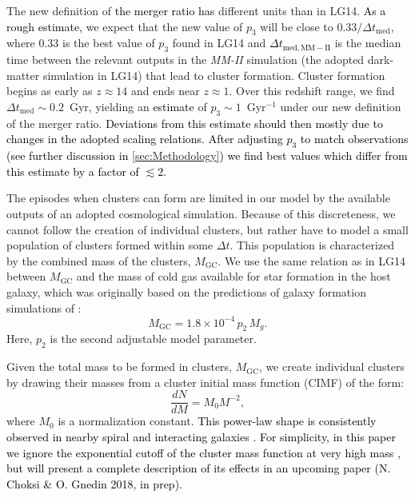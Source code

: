 \documentclass[fleqn,usenatbib]{mnras}
\newcommand{\rev}[1]{\textcolor{black}{#1}}
\newcommand{\Mgc}{M_{\mathrm{GC}}}
\begin{document}
The new definition of \rev{the merger ratio has} different units than in LG14. \rev{As a rough estimate,} we expect that the new value of $p_3$ will be close to $0.33/\Delta t_{\mathrm{med}}$, where 0.33 is the best value of $p_3$ found in LG14 and \rev{$\Delta t_\mathrm{med, MM-II}$} is the median time between the relevant outputs in the \textit{MM-II} simulation (the adopted dark-matter simulation in LG14) that lead to cluster formation. Cluster formation begins as early as $z \approx 14$ and ends near $z \approx 1$. Over this redshift range, we find $\Delta t_{\mathrm{med}} \sim 0.2$~Gyr, yielding an \rev{estimate} of $p_3 \sim 1$~Gyr$^{-1}$ under our new definition of the merger ratio. \rev{Deviations from this estimate should then mostly due to changes in the adopted scaling relations. After adjusting $p_3$ to match observations (see further discussion in \autoref{sec:Methodology}) we find best values which differ from this estimate by a factor of $\lesssim 2$.}

The episodes when clusters can form are limited in our model by the available outputs of an adopted cosmological simulation. Because of this discreteness, we cannot follow the creation of individual clusters, but rather have to model a small population of clusters formed within some $\Delta t$. This population is characterized by the combined mass of the clusters, $\Mgc$.  We use the same relation as in LG14 between $\Mgc$ and the mass of cold gas available for star formation in the host galaxy, which was originally based on the predictions of galaxy formation simulations of \citet{kravtsov_gnedin05}:
\begin{equation}
  \Mgc = 1.8\times 10^{-4}\, p_2 \, M_g.
  \label{eqn:mgc}
\end{equation}
Here, $p_2$ is the second adjustable model parameter. 

Given the total mass to be formed in clusters, $\Mgc$, we create individual clusters by drawing their masses from a cluster initial mass function (CIMF) of the form:
\begin{equation}
  \frac{dN}{dM} = M_0M^{-2},
  \label{eq:cimf}
\end{equation}
where $M_0$ is a normalization constant. \rev{This power-law shape is consistently observed in nearby spiral and interacting galaxies \citep[e.g.][]{portegies_zwart_etal10}. For simplicity, in this paper we ignore the exponential cutoff of the cluster mass function at very high mass \citep[e.g.,][]{gieles_etal_2006a, larsen2009}, but will present a complete description of its effects in an upcoming paper (N. Choksi \& O. Gnedin 2018, in prep).}  
\end{document}
